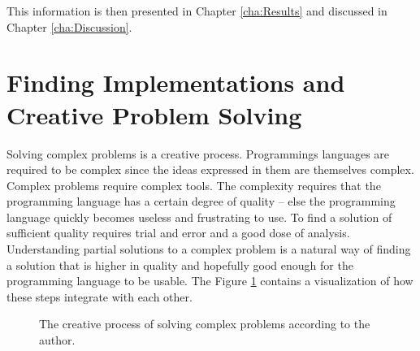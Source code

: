 This information is then presented in Chapter \ref{cha:Results} and discussed in Chapter \ref{cha:Discussion}.

\section{Finding Implementations and Creative Problem Solving}
Solving complex problems is a creative process. Programmings languages are required to be complex since the ideas expressed in them are themselves complex. Complex problems require complex tools. The complexity requires that the programming language
has a certain degree of quality -- else the programming language quickly becomes useless and frustrating to use. To find a solution of sufficient quality requires trial and error and a good dose of analysis. Understanding partial solutions to a complex problem is a natural way of finding a solution that is higher in quality and hopefully good enough for the programming language to be usable. The Figure \ref{figCreativeProcess} contains a visualization of how these steps integrate with each other.

\begin{center}
\begin{figure}[h!]
\centering
{}
\caption{The creative process of solving complex problems according to the author.}
\label{figCreativeProcess}
\end{figure}
\end{center}
